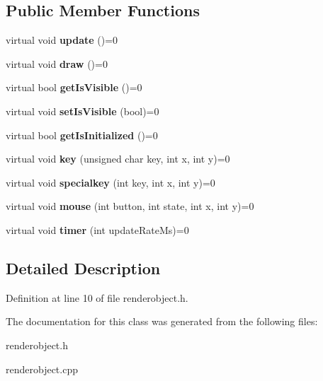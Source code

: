\subsection*{Public Member Functions}
\begin{DoxyCompactItemize}
\item 
virtual void {\bfseries update} ()=0\label{classSoundfieldViewer_1_1IRenderObject_a48565a4f21978fb249963ca8d2cbe2b4}

\item 
virtual void {\bfseries draw} ()=0\label{classSoundfieldViewer_1_1IRenderObject_ab1f5b59d14dcccb4bb93b21d71615279}

\item 
virtual bool {\bfseries get\-Is\-Visible} ()=0\label{classSoundfieldViewer_1_1IRenderObject_aabe51bb1dd1ee99f387267d2b2435a84}

\item 
virtual void {\bfseries set\-Is\-Visible} (bool)=0\label{classSoundfieldViewer_1_1IRenderObject_ac4098a639cd454dc6bd0abe178a0ebbb}

\item 
virtual bool {\bfseries get\-Is\-Initialized} ()=0\label{classSoundfieldViewer_1_1IRenderObject_a84261cb694372a7e490b06a6370401df}

\item 
virtual void {\bfseries key} (unsigned char key, int x, int y)=0\label{classSoundfieldViewer_1_1IRenderObject_a87fed6e56bee9326683f73efd11986b4}

\item 
virtual void {\bfseries specialkey} (int key, int x, int y)=0\label{classSoundfieldViewer_1_1IRenderObject_a758f73858938035ce80ec870549ab485}

\item 
virtual void {\bfseries mouse} (int button, int state, int x, int y)=0\label{classSoundfieldViewer_1_1IRenderObject_ab2c22d696fb542a084e8d3dc84553217}

\item 
virtual void {\bfseries timer} (int update\-Rate\-Ms)=0\label{classSoundfieldViewer_1_1IRenderObject_a6d99c844a418bb6c28499e02266e0aab}

\end{DoxyCompactItemize}


\subsection{Detailed Description}


Definition at line 10 of file renderobject.\-h.



The documentation for this class was generated from the following files\-:\begin{DoxyCompactItemize}
\item 
renderobject.\-h\item 
renderobject.\-cpp\end{DoxyCompactItemize}
